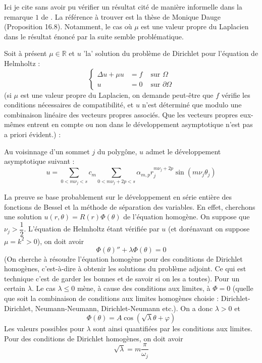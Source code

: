 \documentclass[11pt,a4paper]{article}
\begin{document}
Ici je cite sans avoir pu vérifier un résultat cité de manière informelle dans la remarque $1$ de \cite{petersdorff1990decompositions}. La référence à trouver est la thèse de Monique Dauge \cite{dauge1986regularites} (Proposition 16.8). Notamment, le cas où $\mu$ est une valeur propre du Laplacien dans le résultat énoncé par la suite semble problématique. 

Soit à présent $\mu \in \mathbb{R}$ et $u$ 'la' solution du problème de Dirichlet pour l'équation de Helmholtz : 
\[\left\{\begin{array}{rcl}
\Delta u + \mu u &= f & \text{ sur } \Omega \\
u & = 0 & \text{ sur } \partial \Omega
\end{array}\right.
\]
(si $\mu$ est une valeur propre du Laplacien, on demande peut-être que $f$ vérifie les conditions nécessaires de compatibilité, et $u$ n'est déterminé que modulo une combinaison linéaire des vecteurs propres associés. Que les vecteurs propres eux-mêmes entrent en compte ou non dans le développement asymptotique n'est pas a priori évident.)
 \cite{petersdorff1990decompositions} :
\begin{The} Au voisinnage d'un sommet $j$ du polygône, $u$ admet le développement asymptotique suivant : 
\[ u = \sum_{0 < m\nu_j < s} c_m \sum_{0< m\nu_j + 2p < s} \alpha_{m,p} r_j^{m\nu_j + 2p} \sin(m\nu_j \theta_j)\]
\end{The}
La preuve se base probablement sur le développement en série entière des fonctions de Bessel et la méthode de séparation des variables. En effet, cherchons une solution $u(r,\theta) = R(r)\Phi(\theta)$ de l'équation homogène. On suppose que $\nu_j > \dfrac{1}{2}$. L'équation de Helmholtz étant vérifiée par $u$ (et dorénavant on suppose $\mu = k^2 >0$), on doit avoir 
\[ \Phi(\theta)'' + \lambda\Phi(\theta) = 0\] 
(On cherche à résoudre l'équation homogène pour des conditions de Dirichlet homogènes, c'est-à-dire à obtenir les solutions du problème adjoint. Ce qui est technique c'est de garder les bonnes et de savoir si on les a toutes). 
Pour un certain $\lambda$. Le cas $\lambda \leq 0$ mène, à cause des conditions aux limites, à $\Phi = 0$ (quelle que soit la combinaison de conditions aux limites homogènes choisie : Dirichlet-Dirichlet, Neumann-Neumann, Dirichlet-Neumann etc.). On a donc $\lambda >0$ et
\[\Phi(\theta) = A\cos(\sqrt{\lambda}\theta + \varphi)\] 
Les valeurs possibles pour $\lambda$ sont ainsi quantifiées par les conditions aux limites. Pour des conditions de Dirichlet homogènes, on doit avoir 
\[\sqrt{\lambda} = m\dfrac{\pi}{\omega_j}\]
\end{document}

